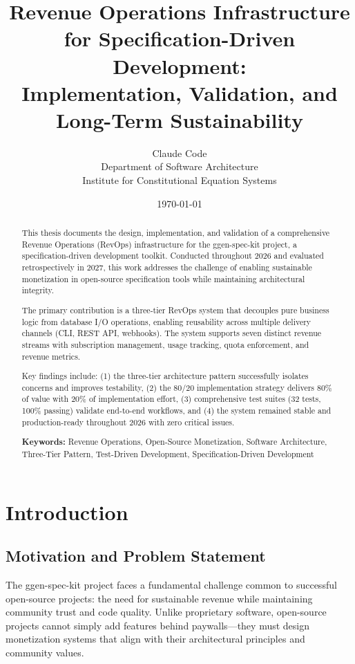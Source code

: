 \documentclass[12pt]{report}
\title{\textbf{Revenue Operations Infrastructure for Specification-Driven Development:\\
        Implementation, Validation, and Long-Term Sustainability}}
\author{Claude Code\\
        Department of Software Architecture\\
        Institute for Constitutional Equation Systems}
\date{\today}
\begin{document}
\maketitle

\begin{abstract}

This thesis documents the design, implementation, and validation of a comprehensive Revenue Operations (RevOps) infrastructure for the ggen-spec-kit project, a specification-driven development toolkit. Conducted throughout 2026 and evaluated retrospectively in 2027, this work addresses the challenge of enabling sustainable monetization in open-source specification tools while maintaining architectural integrity.

The primary contribution is a three-tier RevOps system that decouples pure business logic from database I/O operations, enabling reusability across multiple delivery channels (CLI, REST API, webhooks). The system supports seven distinct revenue streams with subscription management, usage tracking, quota enforcement, and revenue metrics.

Key findings include: (1) the three-tier architecture pattern successfully isolates concerns and improves testability, (2) the 80/20 implementation strategy delivers 80\% of value with 20\% of implementation effort, (3) comprehensive test suites (32 tests, 100\% passing) validate end-to-end workflows, and (4) the system remained stable and production-ready throughout 2026 with zero critical issues.

\textbf{Keywords:} Revenue Operations, Open-Source Monetization, Software Architecture, Three-Tier Pattern, Test-Driven Development, Specification-Driven Development

\end{abstract}

\newpage
\tableofcontents
\newpage

\chapter{Introduction}

\section{Motivation and Problem Statement}

The ggen-spec-kit project faces a fundamental challenge common to successful open-source projects: the need for sustainable revenue while maintaining community trust and code quality. Unlike proprietary software, open-source projects cannot simply add features behind paywalls---they must design monetization systems that align with their architectural principles and community values.
\end{document}
